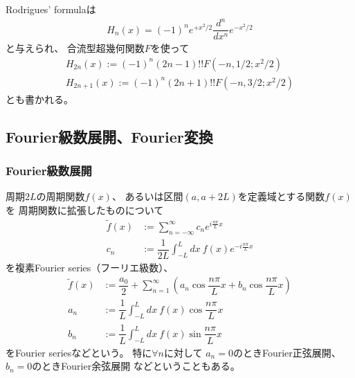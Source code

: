 Rodrigues' formulaは
\begin{align}
    H_n(x)
    =
    (-1)^n e^{ + x^2 / 2 }
    \dfrac{d^n}{dx^n}
    e^{ - x^2 / 2 }
\label{hermite rodrigues formula}
\end{align}
と与えられ、
合流型超幾何関数$F$を使って
\begin{subequations}
\begin{align}
    H_{2n}(x)
    :=
        (-1)^n
        (2 n - 1)!!
    F(-n, 1/2; x^2/2)
\\
    H_{2n+1}(x)
    :=
        (-1)^n
        (2 n + 1)!!
    F(-n, 3/2; x^2/2)
\end{align}
\end{subequations}
とも書かれる。

\newpage
\subsection{Fourier級数展開、Fourier変換}

\subsubsection{Fourier級数展開}

周期$2L$の周期関数$f(x)$、
あるいは区間$(a, a + 2L)$を定義域とする関数$f(x)$を
周期関数に拡張したものについて
\begin{subequations}
\begin{align}
    \tilde{f}(x)
    &:=
    \sum_{n=-\infty}^\infty
    c_n e^{ i\frac{n \pi}{L}x }
\\
    c_n
    &:=
    \dfrac{1}{2L} \int_{-L}^L dx\ 
    f(x) e^{ - i\frac{n \pi}{L}x }
\end{align}
\end{subequations}
を複素Fourier series（フーリエ級数）、
\begin{subequations}
\begin{align}
    \tilde{f}(x)
    &:=
    \dfrac{a_0}{2}
    +
    \sum_{n=1}^\infty
    \left(
        a_n \cos \dfrac{n \pi}{L}x
        +
        b_n \cos \dfrac{n \pi}{L}x
    \right)
\\
    a_n
    &:=
    \dfrac{1}{L} \int_{-L}^L dx\ 
    f(x) \cos\dfrac{n \pi}{L}x
\\
    b_n
    &:=
    \dfrac{1}{L} \int_{-L}^L dx\ 
    f(x) \sin\dfrac{n \pi}{L}x
\end{align}
\end{subequations}
をFourier seriesなどという。
特に$\forall n$に対して
$a_n = 0$のときFourier正弦展開、
$b_n = 0$のときFourier余弦展開
などということもある。

